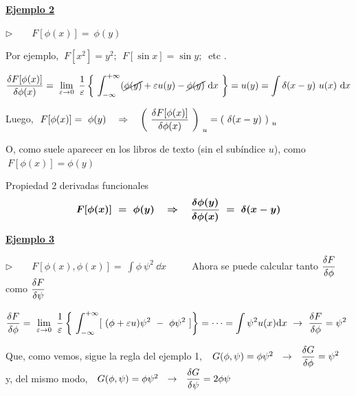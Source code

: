 \vspace{10mm}
\begin{large}{\underline{\textbf{Ejemplo 2}}}\end{large} $\triangleright \qquad F[\phi(x)]=\ \phi(y)$

\vspace{2mm} Por ejemplo, $\ F[x^2]=y^2;\ \ F[\sin x]=\sin y;\ $ etc	.

\vspace{2mm}  $\displaystyle \fdv{F[\phi(x)]}{\phi(x)}=\ \lim_{\varepsilon \to 0} \ \dfrac 1 \varepsilon \left\{ \ \int_{-\infty}^{+\infty} (\cancel{\phi(y)}+\varepsilon u(y) - \cancel{\phi(y)} \ \dd x \ \right\} = u(y) = \int \delta(x-y) \ u(x)\ \dd x$

Luego, $\ \displaystyle F[\phi(x)]=\ \phi(y) \quad \Rightarrow \quad \left( \ \fdv{F[\phi(x)]}{\phi(x)} \ \right)_{\ u}= \left( \ \delta(x-y) \ \right)_{\ u}$

O, como suele aparecer en los libros de texto (sin el subíndice $u$), como $\ F[\phi(x)]=\phi(y)$

\vspace{5mm}
\begin{myblock}{Propiedad 2 derivadas funcionales}
\begin{equation}
 \label{T37P2DF}
 \boldsymbol{
 F[\phi(x)] \ = \  \phi(y) \quad \Rightarrow \quad \fdv{\phi(y)}{\phi(x)} \ = \ \delta(x-y)
 }	
 \end{equation}
\end{myblock}	


\vspace{10mm}
\begin{large}{\underline{\textbf{Ejemplo 3}}}\end{large} $\triangleright \qquad F[\phi(x),\phi(x)]=\ \displaystyle \int \phi\ \psi^2 \ \dd x$	$\qquad $ Ahora se puede calcular tanto $\displaystyle \fdv{F}{\phi}$ como $\displaystyle \fdv{F}{\psi}$


\vspace{2mm}  $\displaystyle \fdv{F}{\phi}=\ \lim_{\varepsilon \to 0} \ \dfrac 1 \varepsilon \left\{ \ \int_{-\infty}^{+\infty} [\ (\phi+\varepsilon u) \psi^2 \ - \ \phi \psi^2 \ ] \right\} = \cdots = \int \psi^2 u(x) \dd x \ \to \ \fdv{F}{\phi}=\psi^2$

Que, como vemos, sigue la regla del ejemplo 1, $\ \ G(\phi,\psi)=\phi\psi^2 \ \ \to\  \ \displaystyle \fdv{G}{\phi}=\psi^2\ $ y, del mismo modo, $\ \ G(\phi,\psi)=\phi\psi^2 \ \ \to\  \ \displaystyle \fdv{G}{\psi}=2\phi \psi$ 





